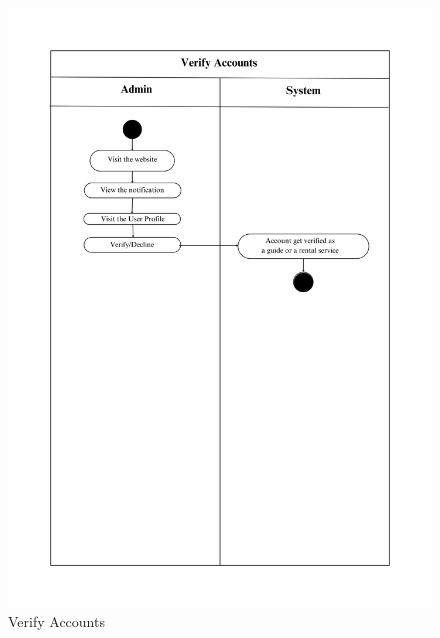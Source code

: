 \begin{figure}[h!]
    \centering
    \includegraphics[width=1\textwidth]{Images/Activity Diagrams/6 Verify Accounts.png}
    \caption{Verify Accounts}
    \label{fig:activity-verify}
\end{figure}



